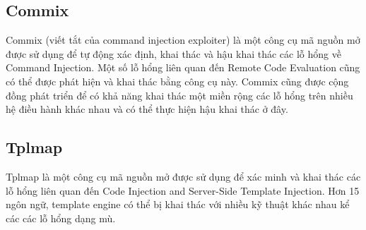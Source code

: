 \documentclass[./../main.tex]{subfiles}
\begin{document}
\subsection{Commix}
Commix (viết tắt của command injection exploiter) là một công cụ mã nguồn mở được sử dụng để tự động xác định, khai thác và hậu khai thác các lỗ hổng về Command Injection. Một số lỗ hổng liên quan đến Remote Code Evaluation cũng có thể được phát hiện và khai thác bằng công cụ này.
Commix cũng được cộng đồng phát triển để có khả năng khai thác một miền rộng các lỗ hổng trên nhiều hệ điều hành khác nhau và có thể thực hiện hậu khai thác ở đây.
\subsection{Tplmap}
Tplmap là một công cụ mã nguồn mở được sử dụng để xác minh và khai thác các lỗ hổng liên quan đến Code Injection and Server-Side Template Injection.
Hơn 15 ngôn ngữ, template engine có thể bị khai thác với nhiều kỹ thuật khác nhau kể các các lỗ hổng dạng mù.
\end{document}
